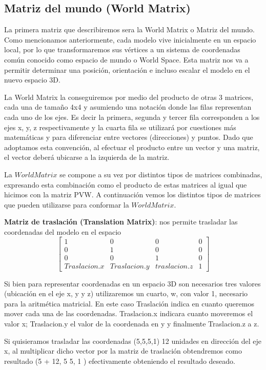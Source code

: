 \documentclass[a4paper]{article}
\begin{document}
\subsection{Matriz del mundo (World Matrix)}
La primera matriz que describiremos sera la  World Matrix o Matriz del mundo.
Como mencionamos anteriormente, cada modelo vive inicialmente en un espacio local,  por lo que transformaremos sus vértices a un sistema de coordenadas común conocido como espacio de mundo o World Space. Esta matriz nos va a permitir determinar una posición,  orientación e incluso escalar el modelo en el nuevo espacio 3D.
\par La World Matrix la conseguiremos por medio del producto de otras 3 matrices, cada una de tamaño 4x4 y asumiendo una notación donde las filas representan cada uno de los ejes. Es decir la primera, segunda y tercer fila corresponden a los ejes x, y, z respectivamente y la cuarta fila se utilizará por cuestiones más matemáticas y para diferenciar entre vectores (direcciones) y puntos. Dado que adoptamos esta convención, al efectuar el producto entre un vector y una matriz, el vector deberá ubicarse a la izquierda de la matriz.
\par La $World Matrix$ se compone a su vez por distintos tipos de matrices combinadas, expresando esta combinación como el producto de estas matrices al igual que hicimos con la matriz PVW. A continuación vemos los distintos tipos de matrices que pueden utilizarse para conformar la $World Matrix$.


\textbf{Matriz de traslación (Translation Matrix)}: nos permite trasladar las coordenadas del modelo en el espacio   
 \[
\begin{bmatrix}
1 & 0 & 0 & 0 \\
0 & 1 & 0 & 0 \\
0 & 0 & 1 & 0 \\
Traslacion.x & Traslacion.y & traslacion.z & 1  
\end{bmatrix}
\]


Si bien para representar  coordenadas en un espacio 3D son necesarios tres valores (ubicación en el eje x, y y z) utilizaremos un cuarto, w, con valor 1, necesario para la aritmética matricial. En este caso Traslación indica en cuanto queremos mover cada una de las coordenadas. Traslacion.x indicara cuanto moveremos el valor x;  Traslacion.y el valor de la coordenada en y y finalmente Traslacion.z a z.
\par Si quisieramos trasladar las coordenadas (5,5,5,1) 12 unidades en dirección del eje x, al multiplicar dicho vector por la matriz de traslación obtendremos como resultado (5 + 12, 5 5, 1 ) efectivamente obteniendo el resultado deseado.  
\end{document}
